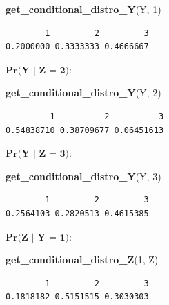 \documentclass[
]{article}
\newenvironment{Shaded}{\begin{snugshade}}{\end{snugshade}}
\newcommand{\DecValTok}[1]{\textcolor[rgb]{0.00,0.00,0.81}{#1}}
\newcommand{\FunctionTok}[1]{\textcolor[rgb]{0.13,0.29,0.53}{\textbf{#1}}}
\newcommand{\NormalTok}[1]{#1}
\begin{document}
\begin{Shaded}
\begin{Highlighting}[]
\FunctionTok{get\_conditional\_distro\_Y}\NormalTok{(Y, }\DecValTok{1}\NormalTok{)}
\end{Highlighting}
\end{Shaded}

\begin{verbatim}
        1         2         3 
0.2000000 0.3333333 0.4666667 
\end{verbatim}

\vspace{0.5cm}

\(\textbf{Pr(Y | Z = 2)}\):

\begin{Shaded}
\begin{Highlighting}[]
\FunctionTok{get\_conditional\_distro\_Y}\NormalTok{(Y, }\DecValTok{2}\NormalTok{)}
\end{Highlighting}
\end{Shaded}

\begin{verbatim}
         1          2          3 
0.54838710 0.38709677 0.06451613 
\end{verbatim}

\vspace{0.5cm}

\(\textbf{Pr(Y | Z = 3)}\):

\begin{Shaded}
\begin{Highlighting}[]
\FunctionTok{get\_conditional\_distro\_Y}\NormalTok{(Y, }\DecValTok{3}\NormalTok{)}
\end{Highlighting}
\end{Shaded}

\begin{verbatim}
        1         2         3 
0.2564103 0.2820513 0.4615385 
\end{verbatim}

\vspace{0.5cm}

\(\textbf{Pr(Z | Y = 1)}\):

\begin{Shaded}
\begin{Highlighting}[]
\FunctionTok{get\_conditional\_distro\_Z}\NormalTok{(}\DecValTok{1}\NormalTok{, Z)}
\end{Highlighting}
\end{Shaded}

\begin{verbatim}
        1         2         3 
0.1818182 0.5151515 0.3030303 
\end{verbatim}
\end{document}
